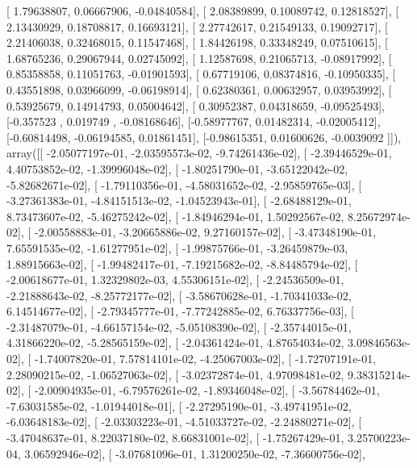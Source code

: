 \documentclass{article}
\begin{document}
       [ 1.79638807,  0.06667906, -0.04840584],
       [ 2.08389899,  0.10089742,  0.12818527],
       [ 2.13430929,  0.18708817,  0.16693121],
       [ 2.27742617,  0.21549133,  0.19092717],
       [ 2.21406038,  0.32468015,  0.11547468],
       [ 1.84426198,  0.33348249,  0.07510615],
       [ 1.68765236,  0.29067944,  0.02745092],
       [ 1.12587698,  0.21065713, -0.08917992],
       [ 0.85358858,  0.11051763, -0.01901593],
       [ 0.67719106,  0.08374816, -0.10950335],
       [ 0.43551898,  0.03966099, -0.06198914],
       [ 0.62380361,  0.00632957,  0.03953992],
       [ 0.53925679,  0.14914793,  0.05004642],
       [ 0.30952387,  0.04318659, -0.09525493],
       [-0.357523  ,  0.019749  , -0.08168646],
       [-0.58977767,  0.01482314, -0.02005412],
       [-0.60814498, -0.06194585,  0.01861451],
       [-0.98615351,  0.01600626, -0.0039092 ]]), array([[ -2.05077197e-01,  -2.03595573e-02,  -9.74261436e-02],
       [ -2.39446529e-01,   4.40753852e-02,  -1.39996048e-02],
       [ -1.80251790e-01,  -3.65122042e-02,  -5.82682671e-02],
       [ -1.79110356e-01,  -4.58031652e-02,  -2.95859765e-03],
       [ -3.27361383e-01,  -4.84151513e-02,  -1.04523943e-01],
       [ -2.68488129e-01,   8.73473607e-02,  -5.46275242e-02],
       [ -1.84946294e-01,   1.50292567e-02,   8.25672974e-02],
       [ -2.00558883e-01,  -3.20665886e-02,   9.27160157e-02],
       [ -3.47348190e-01,   7.65591535e-02,  -1.61277951e-02],
       [ -1.99875766e-01,  -3.26459879e-03,   1.88915663e-02],
       [ -1.99482417e-01,  -7.19215682e-02,  -8.84485794e-02],
       [ -2.00618677e-01,   1.32329802e-03,   4.55306151e-02],
       [ -2.24536509e-01,  -2.21888643e-02,  -8.25772177e-02],
       [ -3.58670628e-01,  -1.70341033e-02,   6.14514677e-02],
       [ -2.79345777e-01,  -7.77242885e-02,   6.76337756e-03],
       [ -2.31487079e-01,  -4.66157154e-02,  -5.05108390e-02],
       [ -2.35744015e-01,   4.31866220e-02,  -5.28565159e-02],
       [ -2.04361424e-01,   4.87654034e-02,   3.09846563e-02],
       [ -1.74007820e-01,   7.57814101e-02,  -4.25067003e-02],
       [ -1.72707191e-01,   2.28090215e-02,  -1.06527063e-02],
       [ -3.02372874e-01,   4.97098481e-02,   9.38315214e-02],
       [ -2.00904935e-01,  -6.79576261e-02,  -1.89346048e-02],
       [ -3.56784462e-01,  -7.63031585e-02,  -1.01944018e-01],
       [ -2.27295190e-01,  -3.49741951e-02,  -6.03648183e-02],
       [ -2.03303223e-01,  -4.51033727e-02,  -2.24880271e-02],
       [ -3.47048637e-01,   8.22037180e-02,   8.66831001e-02],
       [ -1.75267429e-01,   3.25700223e-04,   3.06592946e-02],
       [ -3.07681096e-01,   1.31200250e-02,  -7.36600756e-02],
\end{document}
